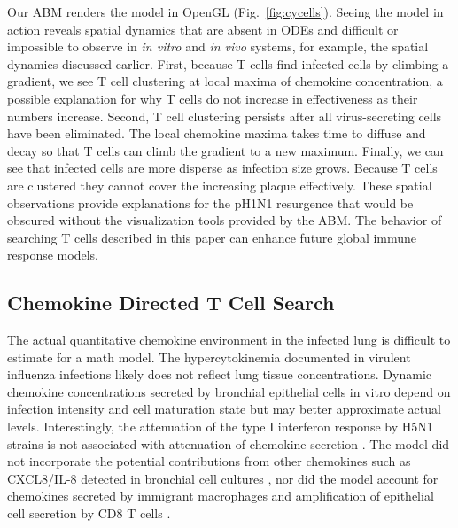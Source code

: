 \documentclass[10pt]{article}
\begin{document}
Our ABM renders the model in OpenGL (Fig.~\ref{fig:cycells}).  Seeing the model in action reveals spatial dynamics that are absent in ODEs and difficult or impossible to observe in \textit{in vitro} and \textit{in vivo} systems, for example, the spatial dynamics discussed earlier.  First, because T cells find infected cells by climbing a gradient, we see T cell clustering at local maxima of chemokine concentration, a possible explanation for why T cells do not increase in effectiveness as their numbers increase.   Second, T cell clustering persists after all virus-secreting cells have been eliminated.  The local chemokine maxima takes time to diffuse and decay so that T cells can climb the gradient to a new maximum.  Finally, we can see that infected cells are more disperse as infection size grows.  Because T cells are clustered they cannot cover the increasing plaque effectively.  These spatial observations provide explanations for the pH1N1 resurgence that would be obscured without the visualization tools provided by the ABM.   The behavior of searching T cells described in this paper 
can enhance future global immune response models.

\subsection*{Chemokine Directed T Cell Search}

 The actual quantitative chemokine environment in the infected lung is difficult to estimate for a math model.  The hypercytokinemia documented in virulent influenza infections \cite{DeJong2006} likely does not reflect lung tissue concentrations.  Dynamic chemokine concentrations secreted by bronchial epithelial cells in vitro depend on infection intensity and cell maturation state \cite{Mitchell2011, Chan2010, Chan2005, Zeng2011} but may better approximate actual levels.  Interestingly, the attenuation of the type I interferon response by H5N1 strains is not associated with attenuation of chemokine secretion \cite{Zeng2007}.  The model did not incorporate the potential contributions from other chemokines such as CXCL8/IL-8 detected in bronchial cell cultures \cite{Matsukura1996, Arndt2002}, nor did the model account for chemokines secreted by immigrant macrophages \cite{Julkunen2000} and amplification of epithelial cell secretion by CD8 T cells \cite{Zhao2000}.
\end{document}
